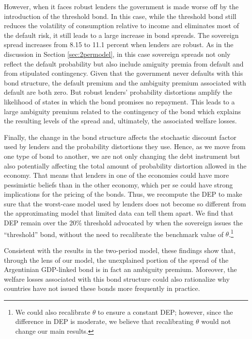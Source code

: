 However, when it faces robust lenders the government is made worse off by the introduction of the threshold bond. In this case, while the threshold bond still reduces the volatility of consumption relative to income and eliminates most of the default risk, it still leads to a large increase in bond spreads. The sovereign spread increases from 8.15 to 11.1 percent when lenders are robust. As in the discussion in Section \ref{sec:2permodel}, in this case sovereign spreads not only reflect the default probability but also include amiguity premia from default and from stipulated contingency. Given that the government never defaults with this bond structure, the default premium and the ambiguity premium associated with default are both zero. But robust lenders' probability distortions amplify the likelihood of states in which the bond promises no repayment. This leads to a large ambiguity premium related to the contingency of the bond which explains the resulting levels of the spread and, ultimately, the associated welfare losses.

Finally, the change in the bond structure affects the stochastic discount factor used by lenders and the probability distortions they use. Hence, as we move from one type of bond to another, we are not only changing the debt instrument but also potentially affecting the total amount of probability distortion allowed in the economy. That means that lenders in one of the economies could have more pessimistic beliefs than in the other economy, which per se could have strong implications for the pricing of the bonds. Thus, we recompute the DEP to make sure that the worst-case model used by lenders does not become so different from the approximating model that limited data can tell them apart. We find that DEP remain over the 20\% threshold advocated by \cite{BarillasHansenSargent} when the sovereign issues the ``threshold'' bond, without the need to recalibrate the benchmark value of $\theta$.\footnote{We could also recalibrate $\theta$ to ensure a constant DEP; however, since the difference in DEP is moderate, we believe that recalibrating $\theta$ would not change our main results.}

Consistent with the results in the two-period model, these findings show that, through the lens of our model, the unexplained portion of the spread of the Argentinian GDP-linked bond \citep*[which the literature has labeled as a novelty premium, see][]{ChamonCostaRicci2008} is in fact an ambiguity premium. Moreover, the welfare losses associated with this bond structure could also rationalize why countries have not issued these bonds more frequently in practice.

